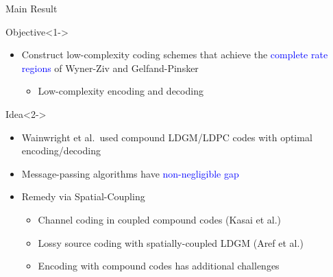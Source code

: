 \documentclass[10pt]{beamer}
\begin{document}
\begin{frame}{Main Result}
  \begin{block}{Objective}<1->
    \begin{itemize}
    \item Construct \alert{low-complexity} coding schemes that achieve the \textcolor{blue}{complete rate regions} of Wyner-Ziv and Gelfand-Pinsker \vspace{0.1cm}
      \begin{itemize}
      \item Low-complexity encoding and decoding
      \end{itemize}
    \end{itemize}
  \end{block}
  \vspace{0.1cm}
  \begin{block}{Idea}<2->
    \begin{itemize}
    \item Wainwright et al.~used compound LDGM/LDPC codes with \alert{optimal encoding/decoding}\vspace{0.1cm}
    \item Message-passing algorithms have \textcolor{blue}{non-negligible gap}\vspace{0.1cm}
    \item<3-> Remedy via \alert{Spatial-Coupling}
      \begin{itemize}
      \item Channel coding in coupled compound codes (Kasai et al.)
      \item Lossy source coding with spatially-coupled LDGM (Aref et al.)
      \item Encoding with \alert{compound codes has additional challenges}
      \end{itemize}
    \end{itemize}
  \end{block}
\end{frame}

\end{document}
